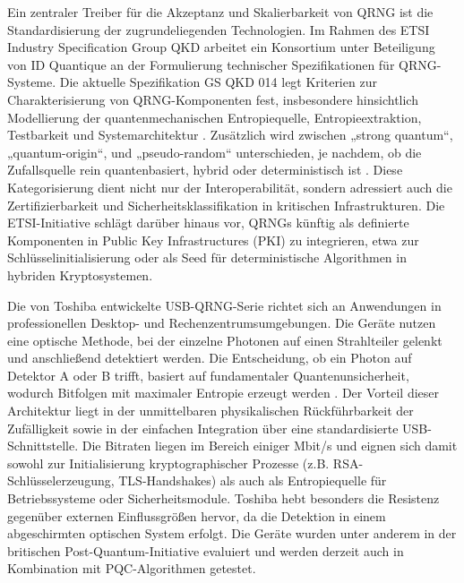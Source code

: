 Ein zentraler Treiber für die Akzeptanz und Skalierbarkeit von QRNG ist die Standardisierung der zugrundeliegenden Technologien. Im Rahmen des ETSI Industry Specification Group QKD arbeitet ein Konsortium unter Beteiligung von ID Quantique an der Formulierung technischer Spezifikationen für QRNG-Systeme. Die aktuelle Spezifikation GS QKD 014 legt Kriterien zur Charakterisierung von QRNG-Komponenten fest, insbesondere hinsichtlich Modellierung der quantenmechanischen Entropiequelle, Entropieextraktion, Testbarkeit und Systemarchitektur \cite{curran_idq_2023}. Zusätzlich wird zwischen „strong quantum“, „quantum-origin“, und „pseudo-random“ unterschieden, je nachdem, ob die Zufallsquelle rein quantenbasiert, hybrid oder deterministisch ist \cite{van_deventer_towards_2022}. Diese Kategorisierung dient nicht nur der Interoperabilität, sondern adressiert auch die Zertifizierbarkeit und Sicherheitsklassifikation in kritischen Infrastrukturen. Die ETSI-Initiative schlägt darüber hinaus vor, QRNGs künftig als definierte Komponenten in Public Key Infrastructures (PKI) zu integrieren, etwa zur Schlüsselinitialisierung oder als Seed für deterministische Algorithmen in hybriden Kryptosystemen.

Die von Toshiba entwickelte USB-QRNG-Serie richtet sich an Anwendungen in professionellen Desktop- und Rechenzentrumsumgebungen. Die Geräte nutzen eine optische Methode, bei der einzelne Photonen auf einen Strahlteiler gelenkt und anschließend detektiert werden. Die Entscheidung, ob ein Photon auf Detektor A oder B trifft, basiert auf fundamentaler Quantenunsicherheit, wodurch Bitfolgen mit maximaler Entropie erzeugt werden \cite{toshiba_europe_cambridge_research_laboratory_quantum_2025}. Der Vorteil dieser Architektur liegt in der unmittelbaren physikalischen Rückführbarkeit der Zufälligkeit sowie in der einfachen Integration über eine standardisierte USB-Schnittstelle. Die Bitraten liegen im Bereich einiger Mbit/s und eignen sich damit sowohl zur Initialisierung kryptographischer Prozesse (z.B. RSA-Schlüsselerzeugung, TLS-Handshakes) als auch als Entropiequelle für Betriebssysteme oder Sicherheitsmodule. Toshiba hebt besonders die Resistenz gegenüber externen Einflussgrößen hervor, da die Detektion in einem abgeschirmten optischen System erfolgt. Die Geräte wurden unter anderem in der britischen Post-Quantum-Initiative evaluiert und werden derzeit auch in Kombination mit PQC-Algorithmen getestet.

